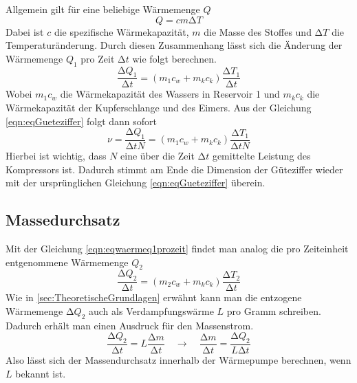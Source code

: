 Allgemein gilt für eine beliebige Wärmemenge $Q$
\begin{equation}
\label{eqn:allgwaerme}
Q = cm \increment T
\end{equation}
Dabei ist $c$ die spezifische Wärmekapazität, $m$ die Masse des Stoffes und $\increment T$ die Temperaturänderung.
Durch diesen Zusammenhang lässt sich die Änderung der Wärmemenge $Q_{1}$ pro Zeit $\increment t$ wie folgt berechnen.
\begin{equation}
\label{eqn:eqwaermeq1prozeit}
\frac{\increment Q_{1}}{\increment t} = (m_{1}c_{w} + m_{k}c_{k})\frac{\increment T_{1}}{\increment t}
\end{equation}
Wobei $m_{1}c_{w}$ die Wärmekapazität des Wassers in Reservoir 1 und $m_{k}c_{k}$ die Wärmekapazität der Kupferschlange und des Eimers.
Aus der Gleichung \eqref{eqn:eqGueteziffer} folgt dann sofort
\begin{equation}
\label{eqn:gueteziffermesswerte}
\nu = \frac{\increment Q_{1}}{\increment t N} = (m_{1}c_{w} + m_{k}c_{k})\frac{\increment T_{1}}{\increment t N}
\end{equation}
Hierbei ist wichtig, dass $N$ eine über die Zeit $\increment t$ gemittelte Leistung des Kompressors ist.
Dadurch stimmt am Ende die Dimension der Güteziffer wieder mit der ursprünglichen Gleichung \eqref{eqn:eqGueteziffer} überein.

\subsection{Massedurchsatz}
\label{sec:massedurchsatz}
Mit der Gleichung \eqref{eqn:eqwaermeq1prozeit} findet man analog die pro Zeiteinheit entgenommene Wärmemenge $Q_{2}$
\begin{equation}
\frac{\increment Q_{2}}{\increment t} = (m_{2}c_{w} + m_{k}c_{k})\frac{\increment T_{2}}{\increment t}
\end{equation}
Wie in \ref{sec:TheoretischeGrundlagen} erwähnt kann man die entzogene Wärmemenge $\increment Q_{2}$ auch als Verdampfungswärme $L$ pro Gramm schreiben.
Dadurch erhält man einen Ausdruck für den Massenstrom.
\begin{equation}
\frac{\increment Q_{2}}{\increment t} = L \frac{\increment m}{\increment t} \quad \to \quad \frac{\increment m}{\increment t} = \frac{\increment Q_{2}}{L \increment t}
\end{equation}
Also lässt sich der Massendurchsatz innerhalb der Wärmepumpe berechnen, wenn $L$ bekannt ist.

